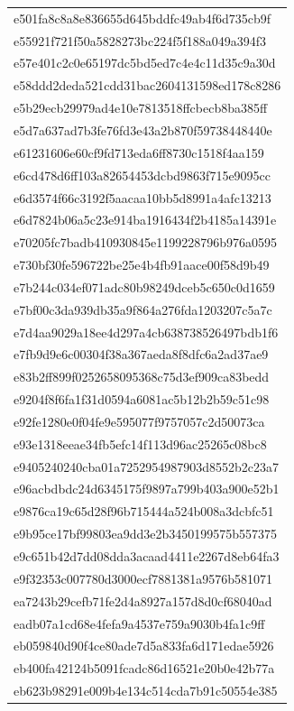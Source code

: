 \begin{tabular}{l}
e501fa8c8a8e836655d645bddfc49ab4f6d735cb9f \\
e55921f721f50a5828273bc224f5f188a049a394f3 \\
e57e401c2c0e65197dc5bd5ed7c4e4c11d35c9a30d \\
e58ddd2deda521cdd31bac2604131598ed178c8286 \\
e5b29ecb29979ad4e10e7813518ffcbecb8ba385ff \\
e5d7a637ad7b3fe76fd3e43a2b870f59738448440e \\
e61231606e60cf9fd713eda6ff8730c1518f4aa159 \\
e6cd478d6ff103a82654453dcbd9863f715e9095cc \\
e6d3574f66c3192f5aacaa10bb5d8991a4afc13213 \\
e6d7824b06a5c23e914ba1916434f2b4185a14391e \\
e70205fc7badb410930845e1199228796b976a0595 \\
e730bf30fe596722be25e4b4fb91aace00f58d9b49 \\
e7b244c034ef071adc80b98249dceb5c650c0d1659 \\
e7bf00c3da939db35a9f864a276fda1203207c5a7c \\
e7d4aa9029a18ee4d297a4cb638738526497bdb1f6 \\
e7fb9d9e6c00304f38a367aeda8f8dfc6a2ad37ae9 \\
e83b2ff899f0252658095368c75d3ef909ca83bedd \\
e9204f8f6fa1f31d0594a6081ac5b12b2b59c51c98 \\
e92fe1280e0f04fe9e595077f9757057c2d50073ca \\
e93e1318eeae34fb5efc14f113d96ac25265c08bc8 \\
e9405240240cba01a7252954987903d8552b2c23a7 \\
e96acbdbdc24d6345175f9897a799b403a900e52b1 \\
e9876ca19c65d28f96b715444a524b008a3dcbfc51 \\
e9b95ce17bf99803ea9dd3e2b3450199575b557375 \\
e9c651b42d7dd08dda3acaad4411e2267d8eb64fa3 \\
e9f32353c007780d3000ecf7881381a9576b581071 \\
ea7243b29cefb71fe2d4a8927a157d8d0cf68040ad \\
eadb07a1cd68e4fefa9a4537e759a9030b4fa1c9ff \\
eb059840d90f4ce80ade7d5a833fa6d171edae5926 \\
eb400fa42124b5091fcadc86d16521e20b0e42b77a \\
eb623b98291e009b4e134c514cda7b91c50554e385 \\

\end{tabular}
